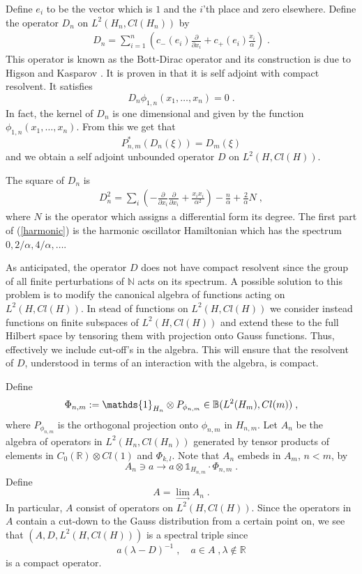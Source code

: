 \documentclass[12pt]{article}
\newcommand{\ba}{\begin{eqnarray}}
\newcommand{\ea}{\end{eqnarray}}
\def\a{\alpha}
\def\l{\lambda}
\newcommand{\pa}{\partial}
\begin{document}
Define $e_i$ to be the vector which is $1$ and the $i$'th place and zero elsewhere. Define the operator $D_n$ on $L^2(H_n,Cl(H_n))$ by
\ba 
D_n = \sum_{i=1}^n \left( c_-(e_i)\frac{\pa}{\pa x_i} + c_+(e_i)\frac{x_i}{\a} \right)\;.
\label{BDirac}
\ea
This operator is known as the Bott-Dirac operator and its construction is due to Higson and Kasparov \cite{Higson}. It is proven in \cite{Higson} that it is self adjoint with compact resolvent. It satisfies
\[
D_n \phi_{1,n}(x_1,\ldots,x_n)=0\;.
\]
In fact, the kernel of $D_n$ is one dimensional and given by the function $\phi_{1,n}(x_1,\ldots,x_n)$. From this we get that
\[
P^\ast_{n,m}(D_n(\xi))=D_m(\xi)
\]
and we obtain a self adjoint unbounded operator $D$ on $L^2(H,Cl(H))$.

The square of $D_n$ is
\ba 
D_n^2 = \sum_i \left(-\frac{\pa}{\pa x_i}\frac{\pa}{\pa x_i} + \frac{x_i x_i}{\a^2}\right)  -\frac{n}{\a}+ \frac{2}{\a}N\;,
\label{harmonic}
\ea
where $N$ is the operator which assigns a differential form its degree. The first part of (\ref{harmonic}) is the harmonic oscillator Hamiltonian which has the spectrum $0,2/\a,4/\a,\ldots$. 

As anticipated, the operator $D$ does not have compact resolvent since the group of all finite perturbations of $\mathbb{N}$ acts on its spectrum. A possible solution to this problem is to modify the canonical algebra of functions acting on $L^2(H,Cl(H))$. In stead of functions on $L^2(H,Cl(H))$ we consider instead functions on finite subspaces of $L^2(H,Cl(H))$ and extend these to the full Hilbert space by tensoring them with projection onto Gauss functions. Thus, effectively we include cut-off's in the algebra. This will ensure that the resolvent of $D$, understood in terms of an interaction with the algebra, is compact.

Define
\[
\Phi_{n,m}:= \mathds{1}_{H_n}\otimes P_{\phi_{n,m}}\in \mathbb{B}(L^2(H_m\\
),Cl(m))\;,
\]
where $P_{\phi_{n,m}}$ is the orthogonal projection onto $\phi_{n,m}$ in $H_{n,m}$. Let $A_n$ be the algebra of operators in $L^2(H_n,Cl(H_n))$ generated by tensor products of elements in $C_0(\mathbb{R})\otimes Cl(1)$ and $\Phi_{k,l}$. Note that $A_n$ embeds in $A_m$, $n<m$, by
\[
A_n\ni a\rightarrow a\otimes \mathds{1}_{H_{n,m}}\cdot \Phi_{n,m}\;.
\]
Define
\[
A = \lim_{\rightarrow} A_n\;.
\]
In particular, $A$ consist of operators on $L^2(H,Cl(H))$. Since the operators in $A$ contain a cut-down to the Gauss distribution from a certain point on, we see that $(A,D,L^2(H,Cl(H)))$ is a spectral triple since
\[
a (\l-D)^{-1} \;,\quad a\in A\;,\l\not\in\mathbb{R}
\]
is a compact operator.
\end{document}
